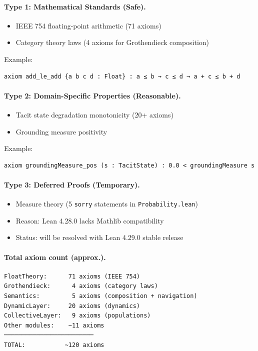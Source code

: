 \paragraph{Type 1: Mathematical Standards (Safe).}
\begin{itemize}
  \item IEEE 754 floating-point arithmetic (71 axioms)
  \item Category theory laws (4 axioms for Grothendieck composition)
\end{itemize}
Example:
\begin{verbatim}
axiom add_le_add {a b c d : Float} : a ≤ b → c ≤ d → a + c ≤ b + d
\end{verbatim}

\paragraph{Type 2: Domain-Specific Properties (Reasonable).}
\begin{itemize}
  \item Tacit state degradation monotonicity (20+ axioms)
  \item Grounding measure positivity
\end{itemize}
Example:
\begin{verbatim}
axiom groundingMeasure_pos (s : TacitState) : 0.0 < groundingMeasure s
\end{verbatim}

\paragraph{Type 3: Deferred Proofs (Temporary).}
\begin{itemize}
  \item Measure theory (5 \texttt{sorry} statements in \texttt{Probability.lean})
  \item Reason: Lean 4.28.0 lacks Mathlib compatibility
  \item Status: will be resolved with Lean 4.29.0 stable release
\end{itemize}

\paragraph{Total axiom count (approx.).}
\begin{verbatim}
FloatTheory:      71 axioms (IEEE 754)
Grothendieck:      4 axioms (category laws)
Semantics:         5 axioms (composition + navigation)
DynamicLayer:     20 axioms (dynamics)
CollectiveLayer:   9 axioms (populations)
Other modules:    ~11 axioms
─────────────────────────
TOTAL:           ~120 axioms
\end{verbatim}

